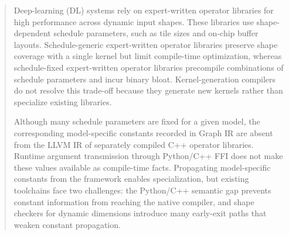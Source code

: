 \begin{abstract}
{\color{red}%
\par}
{\color{blue}%
Deep-learning (DL) systems rely on expert-written operator libraries for high performance across dynamic input shapes. These libraries use shape-dependent schedule parameters, such as tile sizes and on-chip buffer layouts. Schedule-generic expert-written operator libraries preserve shape coverage with a single kernel but limit compile-time optimization, whereas schedule-fixed expert-written operator libraries precompile combinations of schedule parameters and incur binary bloat. Kernel-generation compilers do not resolve this trade-off because they generate new kernels rather than specialize existing libraries.
\par}

{\color{red}%
\par}
{\color{blue}%
Although many schedule parameters are fixed for a given model, the corresponding model-specific constants recorded in Graph IR are absent from the LLVM IR of separately compiled C++ operator libraries. Runtime argument transmission through Python/C++ FFI does not make these values available as compile-time facts. Propagating model-specific constants from the framework enables specialization, but existing toolchains face two challenges: the Python/C++ semantic gap prevents constant information from reaching the native compiler, and shape checkers for dynamic dimensions introduce many early-exit paths that weaken constant propagation.
\par}


\end{abstract}
